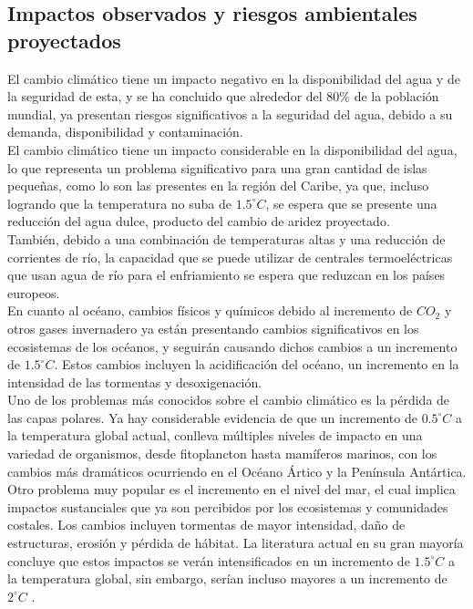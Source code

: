 \documentclass{article}
\begin{document}
\subsection{Impactos observados y riesgos ambientales proyectados}
El cambio climático tiene un impacto negativo en la disponibilidad del agua y de la seguridad de esta, y se ha concluido que alrededor del 80\% de la población mundial, ya presentan riesgos significativos a la seguridad del agua, debido a su demanda, disponibilidad y contaminación.
\\
El cambio climático tiene un impacto considerable en la disponibilidad del agua, lo que representa un problema significativo para una gran cantidad de islas pequeñas, como lo son las presentes en la región del Caribe, ya que, incluso logrando que la temperatura no suba de $1.5^{\circ}C$, se espera que se presente una reducción del agua dulce, producto del cambio de aridez proyectado.
\\
También, debido a una combinación de temperaturas altas y una reducción de corrientes de río, la capacidad que se puede utilizar de centrales termoeléctricas que usan agua de río para el enfriamiento se espera que reduzcan en los países europeos.
\\
En cuanto al océano, cambios físicos y químicos debido al incremento de $CO_{2}$ y otros gases invernadero ya están presentando cambios significativos en los ecosistemas de los océanos, y seguirán causando dichos cambios a un incremento de $1.5^{\circ}C$. Estos cambios incluyen la acidificación del océano, un incremento en la intensidad de las tormentas y desoxigenación.
\\
Uno de los problemas más conocidos sobre el cambio climático es la pérdida de las capas polares. Ya hay considerable evidencia de que un incremento de $0.5^{\circ}C$ a la temperatura global actual, conlleva múltiples niveles de impacto en una variedad de organismos, desde fitoplancton hasta mamíferos marinos, con los cambios más dramáticos ocurriendo en el Océano Ártico y la Península Antártica.
\\
Otro problema muy popular es el incremento en el nivel del mar, el cual implica impactos sustanciales que ya son percibidos por los ecosistemas y comunidades costales. Los cambios incluyen tormentas de mayor intensidad, daño de estructuras, erosión y pérdida de hábitat. La literatura actual en su gran mayoría concluye que estos impactos se verán intensificados en un incremento de $1.5^{\circ}C$ a la temperatura global, sin embargo, serían incluso mayores a un incremento de $2^{\circ}C$ \cite{Hoegh}.
\end{document}
